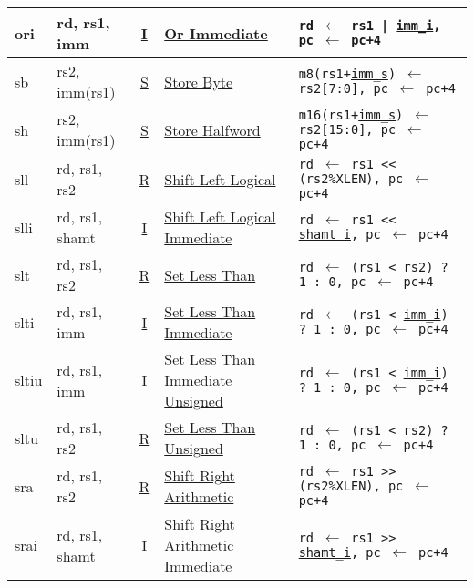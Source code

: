 {\begin{tabular}{|ll|c|l|l|}
\hline
ori   & rd, rs1, imm  & \hyperref[insnformat:itype]{I} & \hyperref[insn:ori]{Or Immediate}               & {\tt rd $\leftarrow$ rs1 | \hyperref[imm.i:decode]{imm\_i}, pc $\leftarrow$ pc+4}\\
\hline
sb    & rs2, imm(rs1) & \hyperref[insnformat:stype]{S} & \hyperref[insn:sb]{Store Byte}                  & {\tt m8(rs1+\hyperref[imm.s:decode]{imm\_s}) $\leftarrow$ rs2[7:0], pc $\leftarrow$ pc+4}\\
\hline
sh    & rs2, imm(rs1) & \hyperref[insnformat:stype]{S} & \hyperref[insn:sh]{Store Halfword}              & {\tt m16(rs1+\hyperref[imm.s:decode]{imm\_s}) $\leftarrow$ rs2[15:0], pc $\leftarrow$ pc+4}\\
\hline
sll   & rd, rs1, rs2   & \hyperref[insnformat:rtype]{R} & \hyperref[insn:sll]{Shift Left Logical}        & {\tt rd $\leftarrow$ rs1 << (rs2\%XLEN), pc $\leftarrow$ pc+4}\\
\hline
slli  & rd, rs1, shamt & \hyperref[insnformat:itype]{I} & \hyperref[insn:slli]{Shift Left Logical Immediate} & {\tt rd $\leftarrow$ rs1 << \hyperref[shamt.i:decode]{shamt\_i}, pc $\leftarrow$ pc+4}\\
\hline
slt   & rd, rs1, rs2   & \hyperref[insnformat:rtype]{R} & \hyperref[insn:slt]{Set Less Than}             & {\tt rd $\leftarrow$ (rs1 < rs2) ? 1 : 0, pc $\leftarrow$ pc+4}\\
\hline
slti  & rd, rs1, imm  & \hyperref[insnformat:itype]{I} & \hyperref[insn:slti]{Set Less Than Immediate}   & {\tt rd $\leftarrow$ (rs1 < \hyperref[imm.i:decode]{imm\_i}) ? 1 : 0, pc $\leftarrow$ pc+4}\\
\hline
sltiu & rd, rs1, imm  & \hyperref[insnformat:itype]{I} & \hyperref[insn:sltiu]{Set Less Than Immediate Unsigned} & {\tt rd $\leftarrow$ (rs1 < \hyperref[imm.i:decode]{imm\_i}) ? 1 : 0, pc $\leftarrow$ pc+4}\\
\hline
sltu  & rd, rs1, rs2   & \hyperref[insnformat:rtype]{R} & \hyperref[insn:sltu]{Set Less Than Unsigned}   & {\tt rd $\leftarrow$ (rs1 < rs2) ? 1 : 0, pc $\leftarrow$ pc+4}\\
\hline
sra   & rd, rs1, rs2   & \hyperref[insnformat:rtype]{R} & \hyperref[insn:sra]{Shift Right Arithmetic}    & {\tt rd $\leftarrow$ rs1 >> (rs2\%XLEN), pc $\leftarrow$ pc+4}\\
\hline
srai  & rd, rs1, shamt & \hyperref[insnformat:itype]{I} & \hyperref[insn:srai]{Shift Right Arithmetic Immediate} & {\tt rd $\leftarrow$ rs1 >> \hyperref[shamt.i:decode]{shamt\_i}, pc $\leftarrow$ pc+4}\\

\end{tabular}}
